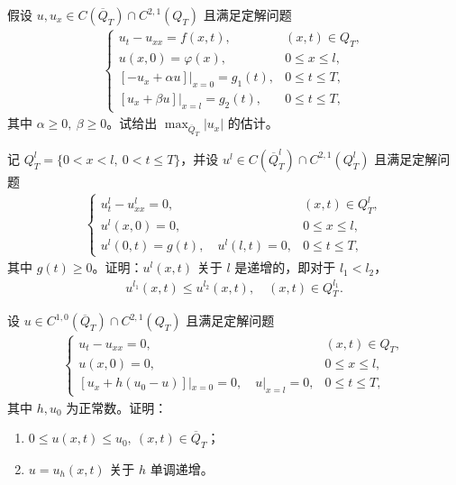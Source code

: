\documentclass[../../main.tex]{subfiles}%
\begin{document}
\begin{example}
假设 $u,u_x\in C(\overline{Q}_T)\cap C^{2,1}(Q_T)$ 且满足定解问题
\begin{align*}
\begin{cases}
u_t-u_{xx}=f(x,t), & (x,t)\in Q_T,\\
u(x,0)=\varphi(x), & 0\leqslant x\leqslant l,\\
[-u_x+\alpha u]|_{x=0}=g_1(t), & 0\leqslant t\leqslant T,\\
[u_x+\beta u]|_{x=l}=g_2(t), & 0\leqslant t\leqslant T,
\end{cases}
\end{align*}
其中 $\alpha\geqslant 0,\ \beta\geqslant 0$。试给出 $\max_{\overline{Q}_T}|u_x|$ 的估计。
\end{example}

\begin{example}
记 $Q_T^l=\{0<x<l,\ 0<t\leqslant T\}$，并设 $u^l\in C(\overline{Q}_T^l)\cap C^{2,1}(Q_T^l)$ 且满足定解问题
\begin{align*}
\begin{cases}
u_t^l-u_{xx}^l=0, & (x,t)\in Q_T^l,\\
u^l(x,0)=0, & 0\leqslant x\leqslant l,\\
u^l(0,t)=g(t),\quad u^l(l,t)=0, & 0\leqslant t\leqslant T,
\end{cases}
\end{align*}
其中 $g(t)\geqslant 0$。证明：$u^l(x,t)$ 关于 $l$ 是递增的，即对于 $l_1<l_2$，
\begin{align*}
u^{l_1}(x,t)\leqslant u^{l_2}(x,t),\quad (x,t)\in Q_T^{l_1}.
\end{align*}
\end{example}

\begin{example}
设 $u\in C^{1,0}(\overline{Q}_T)\cap C^{2,1}(Q_T)$ 且满足定解问题
\begin{align*}
\begin{cases}
u_t-u_{xx}=0, & (x,t)\in Q_T,\\
u(x,0)=0, & 0\leqslant x\leqslant l,\\
[u_x+h(u_0-u)]|_{x=0}=0,\quad u|_{x=l}=0, & 0\leqslant t\leqslant T,
\end{cases}
\end{align*}
其中 $h,u_0$ 为正常数。证明：
\begin{enumerate}[(1)]
\item $0\leqslant u(x,t)\leqslant u_0,\ (x,t)\in\overline{Q}_T$；
\item $u=u_h(x,t)$ 关于 $h$ 单调递增。
\end{enumerate}
\end{example}
\end{document}
